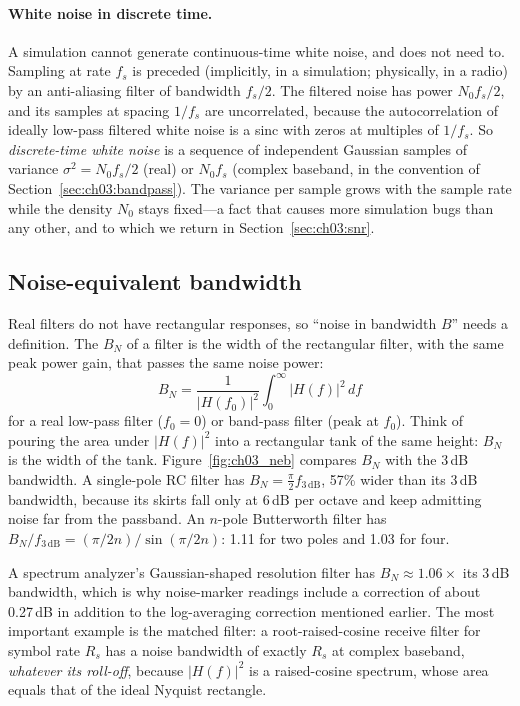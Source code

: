 \paragraph{White noise in discrete time.} A simulation cannot generate continuous-time white noise,
and does not need to. Sampling at rate $f_s$ is preceded (implicitly, in a simulation; physically, in
a radio) by an anti-aliasing filter of bandwidth $f_s/2$. The filtered noise has power $N_0f_s/2$,
and its samples at spacing $1/f_s$ are uncorrelated, because the autocorrelation of ideally low-pass
filtered white noise is a sinc with zeros at multiples of $1/f_s$. So \emph{discrete-time white
noise} is a sequence of independent Gaussian samples of variance $\sigma^2=N_0f_s/2$ (real) or
$N_0f_s$ (complex baseband, in the convention of Section~\ref{sec:ch03:bandpass}). The variance per
sample grows with the sample rate while the density $N_0$ stays fixed---a fact that causes more
simulation bugs than any other, and to which we return in Section~\ref{sec:ch03:snr}.

\subsection{Noise-equivalent bandwidth}

Real filters do not have rectangular responses, so ``noise in bandwidth $B$'' needs a definition. The
 $B_N$ of a filter is the width of the rectangular filter, with the
same peak power gain, that passes the same noise power:
\begin{equation}
B_N=\frac{1}{|H(f_0)|^2}\int_0^\infty|H(f)|^2\,df
\label{eq:ch03:neb}
\end{equation}
for a real low-pass filter ($f_0=0$) or band-pass filter (peak at $f_0$). Think of pouring the area
under $|H(f)|^2$ into a rectangular tank of the same height: $B_N$ is the width of the tank.
Figure~\ref{fig:ch03_neb} compares $B_N$ with the 3\,dB bandwidth. A single-pole RC filter has
$B_N=\frac{\pi}{2}f_{3\,\mathrm{dB}}$, 57\% wider than its 3\,dB bandwidth, because its skirts fall
only at 6\,dB per octave and keep admitting noise far from the passband. An $n$-pole Butterworth
filter has $B_N/f_{3\,\mathrm{dB}}=(\pi/2n)/\sin(\pi/2n)$: 1.11 for two poles and 1.03 for four.

A spectrum analyzer's Gaussian-shaped resolution filter has $B_N\approx1.06\times$ its 3\,dB
bandwidth, which is why noise-marker readings include a correction of about 0.27\,dB in addition to
the log-averaging correction mentioned earlier. The most important example is the matched filter: a
root-raised-cosine receive filter for symbol rate $R_s$ has a noise bandwidth of exactly $R_s$ at
complex baseband, \emph{whatever its roll-off}, because $|H(f)|^2$ is a raised-cosine spectrum, whose
area equals that of the ideal Nyquist rectangle.

